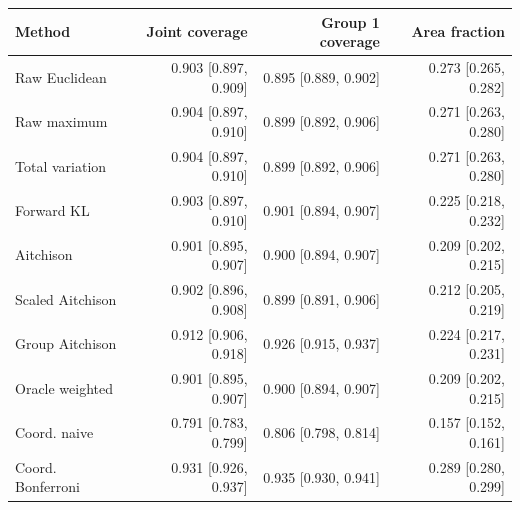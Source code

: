 \begin{tabular}{lrrr}
\toprule
Method & Joint coverage & Group 1 coverage & Area fraction \\
\midrule
Raw Euclidean & 0.903 [0.897, 0.909] & 0.895 [0.889, 0.902] & 0.273 [0.265, 0.282] \\
Raw maximum & 0.904 [0.897, 0.910] & 0.899 [0.892, 0.906] & 0.271 [0.263, 0.280] \\
Total variation & 0.904 [0.897, 0.910] & 0.899 [0.892, 0.906] & 0.271 [0.263, 0.280] \\
Forward KL & 0.903 [0.897, 0.910] & 0.901 [0.894, 0.907] & 0.225 [0.218, 0.232] \\
Aitchison & 0.901 [0.895, 0.907] & 0.900 [0.894, 0.907] & 0.209 [0.202, 0.215] \\
Scaled Aitchison & 0.902 [0.896, 0.908] & 0.899 [0.891, 0.906] & 0.212 [0.205, 0.219] \\
Group Aitchison & 0.912 [0.906, 0.918] & 0.926 [0.915, 0.937] & 0.224 [0.217, 0.231] \\
Oracle weighted & 0.901 [0.895, 0.907] & 0.900 [0.894, 0.907] & 0.209 [0.202, 0.215] \\
Coord. naive & 0.791 [0.783, 0.799] & 0.806 [0.798, 0.814] & 0.157 [0.152, 0.161] \\
Coord. Bonferroni & 0.931 [0.926, 0.937] & 0.935 [0.930, 0.941] & 0.289 [0.280, 0.299] \\
\bottomrule
\end{tabular}
